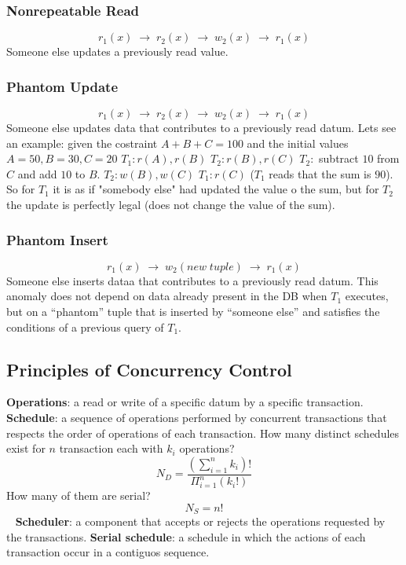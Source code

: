 \subsubsection{Nonrepeatable Read}
\[
    r_1(x) \; \rightarrow \; r_2(x) \; \rightarrow \; w_2(x) \; \rightarrow \; r_1(x)
\]
Someone else updates a previously read value.
\subsubsection{Phantom Update}
\[
    r_1(x) \; \rightarrow \; r_2(x) \; \rightarrow \; w_2(x) \; \rightarrow \; r_1(x)
\]
Someone else updates data that contributes to a previously read datum.\newline
\newline
Lets see an example: given the costraint $A+B+C = 100$ and the initial values $A = 50, B = 30, C = 20$\newline
$T_1 : r(A), r(B)$\newline
$T_2 : r(B), r(C)$\newline
$T_2 : $ subtract $10$ from $C$ and add $10$ to $B$.\newline
$T_2 : w(B), w(C)$\newline
$T_1 : r(C)$ ($T_1$ reads that the sum is $90$).\newline
So for $T_1$ it is as if "somebody else" had updated the value o the sum, but for $T_2$ the update is perfectly legal (does not change the value of the sum). 
\subsubsection{Phantom Insert}
\[
    r_1(x) \; \rightarrow \; w_2(new\; tuple) \; \rightarrow \; r_1(x)
\]
Someone else inserts dataa that contributes to a previously read datum.\newline
\newline
This anomaly does not depend on data already present in the DB when $T_1$ executes, but on a “phantom” tuple that is inserted by “someone else” and satisfies the conditions of a previous query of $T_1$.
\subsection{Principles of Concurrency Control}
\textbf{Operations}: a read or write of a specific datum by a specific transaction.\newline
\newline
\textbf{Schedule}: a sequence of operations performed by concurrent transactions that respects the order of operations of each transaction.\newline
How many distinct schedules exist for $n$ transaction each with $k_i$ operations?
\[
    N_D = \frac{\left(\sum_{i=1}^{n}k_i\right)!}{\Pi_{i=1}^n (k_i !)}
\]
How many of them are serial?
\[
    N_S = n!
\]
\ \newline
\textbf{Scheduler}: a component that accepts or rejects the operations requested by the transactions.\newline
\newline
\textbf{Serial schedule}: a schedule in which the actions of each transaction occur in a contiguos sequence.
